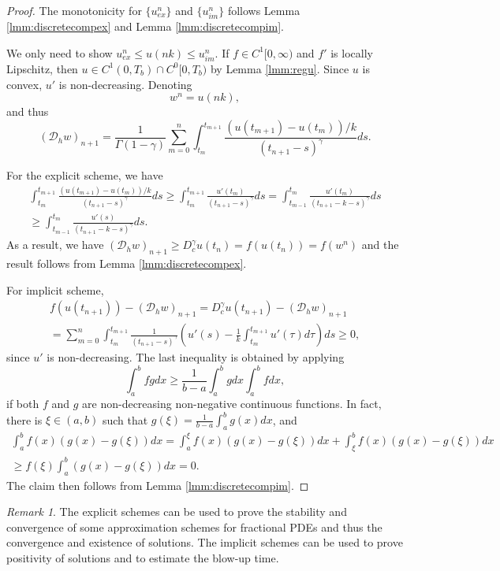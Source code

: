 \documentclass[12pt]{amsart}%
\theoremstyle{definition}
\theoremstyle{remark}
\newtheorem{rmk}[thm]{Remark}
\renewcommand{\geq}{\geqslant}
\renewcommand{\ge}{\geqslant}
\renewcommand{\le}{\leqslant}
\begin{document}
\begin{proof}
The monotonicity for $\{u_{ex}^n\}$ and $\{u_{im}^n\}$ follows Lemma \ref{lmm:discretecompex} and Lemma \ref{lmm:discretecompim}.

We only need to show $u_{ex}^n\le u(nk)\le u_{im}^n$. 
If $f\in C^1[0,\infty)$ and $f'$ is locally Lipschitz, then $u\in C^1(0, T_b)\cap C^0[0, T_b)$ by Lemma \ref{lmm:regu}.  Since $u$ is convex, $u'$ is non-decreasing. 
Denoting 
\[
w^n=u(nk),
\]
and thus
\[
(\mathcal{D}_hw)_{n+1}=\frac{1}{\Gamma(1-\gamma)}\sum_{m=0}^n\int_{t_m}^{t_{m+1}}\frac{(u(t_{m+1})-u(t_m))/k}{(t_{n+1}-s)^{\gamma}}ds.
\]


For the explicit scheme, we have 
\begin{multline*}
\int_{t_m}^{t_{m+1}}\frac{(u(t_{m+1})-u(t_m))/k}{(t_{n+1}-s)^{\gamma}}ds
\ge \int_{t_m}^{t_{m+1}}\frac{u'(t_m)}{(t_{n+1}-s)^{\gamma}}ds
= \int_{t_{m-1}}^{t_{m}}\frac{u'(t_m)}{(t_{n+1}-k-s)^{\gamma}}ds\\
\ge \int_{t_{m-1}}^{t_{m}}\frac{u'(s)}{(t_{n+1}-k-s)^{\gamma}}ds.
\end{multline*}
As a result, we have $(\mathcal{D}_hw)_{n+1}\ge D_c^{\gamma}u(t_{n})=f(u(t_n))=f(w^n)$ and the result follows from Lemma \ref{lmm:discretecompex}.

For implicit scheme, 
\begin{multline*}
f(u(t_{n+1}))-(\mathcal{D}_hw)_{n+1}=
D_c^{\gamma}u(t_{n+1})-(\mathcal{D}_hw)_{n+1}\\
=\sum_{m=0}^n\int_{t_m}^{t_{m+1}}\frac{1}{(t_{n+1}-s)^{\gamma}}\left(u'(s)-\frac{1}{k}\int_{t_m}^{t_{m+1}}u'(\tau)d\tau\right)ds\ge 0,
\end{multline*}
since $u'$ is non-decreasing. The last inequality is obtained by applying 
\begin{equation}\label{last}
\int_a^b f g dx \ge \frac{1}{b-a}\int_a^b g dx \int_a^b f dx,
\end{equation}
 if both $f$ and $g$ are non-decreasing non-negative continuous functions. In fact, there is $\xi\in (a, b)$ such that $g(\xi)=\frac{1}{b-a}\int_a^b g(x)dx$, and
\begin{multline*}
\int_a^b f(x)(g(x)-g(\xi))dx=\int _a^{\xi} f(x)(g(x)-g(\xi))dx+\int _{\xi}^{b} f(x)(g(x)-g(\xi))dx\\
\geq f(\xi)\int _a^{b} (g(x)-g(\xi))dx=0.
\end{multline*}
The claim then follows from Lemma \ref{lmm:discretecompim}.
\end{proof}

\begin{rmk}
The explicit schemes can be used to prove the stability and convergence of some approximation schemes for fractional PDEs and thus the convergence and existence of solutions. The implicit schemes can be used to prove positivity of solutions and to estimate the blow-up time. 
\end{rmk}
\end{document}
